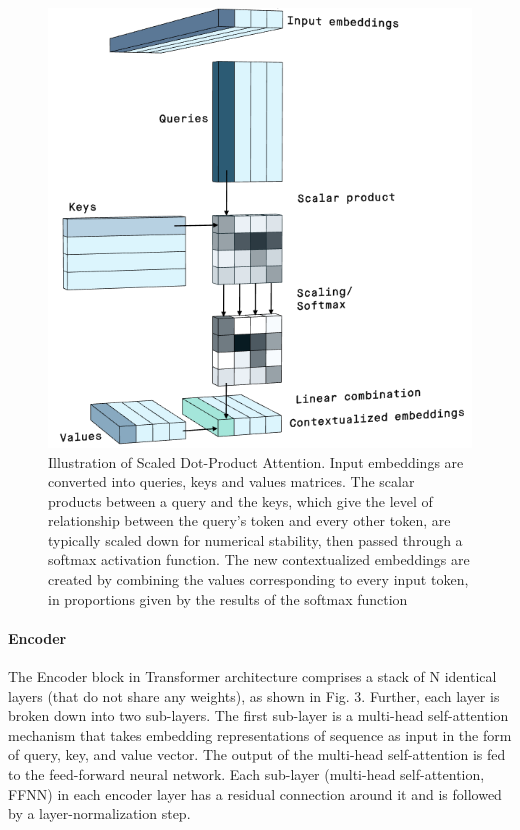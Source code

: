 \documentclass[conference]{IEEEtran}
\begin{document}
\begin{figure}[htbp]
\centerline{\includegraphics[scale=0.4]{Images/scaled_dot_product.png}}
\caption{Illustration of Scaled Dot-Product Attention. Input embeddings are converted into queries, keys and values matrices. The scalar products between a query and the keys, which give the level of relationship between the query’s token and every other token, are typically scaled down for numerical stability, then passed through a softmax activation function. The new contextualized embeddings are created by combining the values corresponding to every input token, in proportions given by the results of the softmax function\cite{b11}}
\label{fig}
\end{figure}

\paragraph{\textbf{Encoder}}
The Encoder block in Transformer architecture comprises a stack of N identical layers (that do not share any weights), as shown in Fig. 3. Further, each layer is broken down into two sub-layers. The first sub-layer is a  multi-head self-attention mechanism that takes embedding representations of sequence as input in the form of query, key, and value vector. The output of the multi-head self-attention is fed to the feed-forward neural network. Each sub-layer (multi-head self-attention, FFNN) in each encoder layer has a residual connection around it and is followed by a layer-normalization step.
\end{document}
